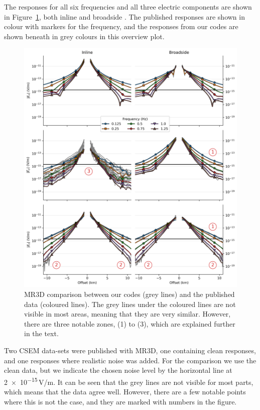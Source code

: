 \documentclass[extra, camera,%
]{gji}
\begin{document}
The responses for all six frequencies and all three electric components are shown in Figure~\ref{fig:results-marlim-responses}, both inline and broadside . The published responses are shown in colour with markers for the frequency, and the responses from our codes are shown beneath in grey colours in this overview plot.
%
\begin{figure}
  \centering
  \includegraphics[width=.9\linewidth]{figures/results-marlim-responses.png}
  \caption{MR3D comparison between our codes (grey lines) and the published data (coloured lines). The grey lines under the coloured lines are not visible in most areas, meaning that they are very similar. However, there are three notable zones, (1) to (3), which are explained further in the text.}
  \label{fig:results-marlim-responses}
\end{figure}
%
Two CSEM data-sets were published with MR3D, one containing clean responses, and one responses where realistic noise was added. For the comparison we use the clean data, but we indicate the chosen noise level by the horizontal line at \num{2e-15}\,V/m. It can be seen that the grey lines are not visible for most parts, which means that the data agree well. However, there are a few notable points where this is not the case, and they are marked with numbers in the figure.
\end{document}

